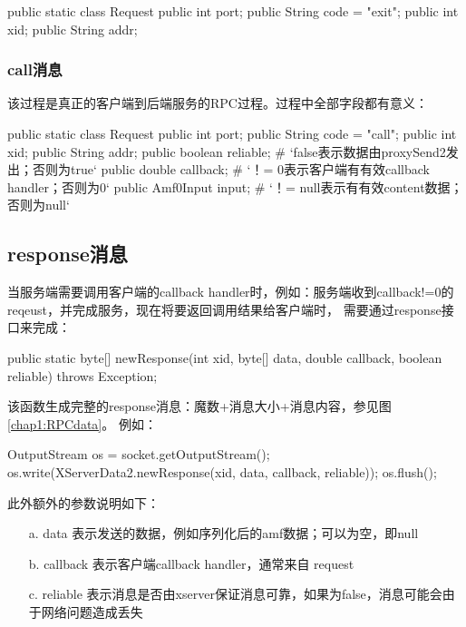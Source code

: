 \begin{javacode}
    public static class Request {
        public int port;
        public String code = "exit";
        public int xid;
        public String addr;
    }
\end{javacode}

\subsubsection{call消息}
该过程是真正的客户端到后端服务的RPC过程。过程中全部字段都有意义：
\begin{javacode}
    public static class Request {
        public int port;
        public String code = "call";
        public int xid;
        public String addr;
        public boolean reliable;   # `{\songti false表示数据由proxySend2发出；否则为true}`
        public double callback;    # `{\songti ！= 0表示客户端有有效callback handler；否则为0}`
        public Amf0Input input;    # `{\songti ！= null表示有有效content数据；否则为null}`
    }
\end{javacode}

\subsection{response消息}

当服务端需要调用客户端的callback handler时，例如：服务端收到callback!=0的reqeust，并完成服务，现在将要返回调用结果给客户端时，
需要通过response接口来完成：

\begin{javacode}
    public static byte[] newResponse(int xid, byte[] data, double callback, boolean reliable) throws Exception;
\end{javacode}

该函数生成完整的response消息：魔数+消息大小+消息内容，参见图\ref{chap1:RPCdata}。
例如：
\begin{javacode}
    OutputStream os = socket.getOutputStream();
    os.write(XServerData2.newResponse(xid, data, callback, reliable));
    os.flush();
\end{javacode}

此外额外的参数说明如下：

\begin{itemize}
    \item [a.] data 表示发送的数据，例如序列化后的amf数据；可以为空，即null
    \item [b.] callback 表示客户端callback handler，通常来自 request
    \item [c.] reliable 表示消息是否由xserver保证消息可靠，如果为false，消息可能会由于网络问题造成丢失
\end{itemize}

